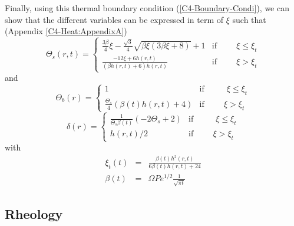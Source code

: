Finally,      using      this     thermal      boundary      condition
(\ref{C4-Boundary-Condi}), we  can show  that the  different variables
can   be   expressed   in   term  of   $\xi$   such   that   (Appendix
\ref{C4-Heat:AppendixA})
\begin{equation}
  \Theta_s(r,t)=
  \begin{cases}
    \frac{3 \beta}{4} \xi - \frac{\sqrt{3}}{4} \sqrt{\beta \xi \left(3 \beta \xi + 8\right)} + 1 & \text{if} \hspace{1cm} \xi\leq \xi_t \\
    \frac{- 12  \xi +  6 h{\left  (r,t \right  )}}{\left(\beta h{\left
            (r,t  \right  )} +  6\right)  h{\left  (r,t \right  )}}  &
    \text{if} \hspace{1cm} \xi > \xi_t
  \end{cases}
  \label{C4-TS}
\end{equation}
and
\begin{equation}
  \Theta_b(r)=
  \begin{cases}
    1 &\text{if } \hspace{1cm} \xi\leq \xi_t \\
    \frac{\Theta_{s}}{4}  \left(\beta(t)  h{\left  (r,t  \right  )}  +
      4\right) & \text{if} \hspace{1cm} \xi > \xi_t
  \end{cases}
  \label{C4-TB}
\end{equation}
\begin{equation}
  \delta(r)=
  \begin{cases}
    \frac{1}{\Theta_{s} \beta(t)} \left(- 2 \Theta_{s} + 2\right) &\text{if } \hspace{1cm} \xi\leq \xi_t \\
    h(r,t)/2 & \text{if} \hspace{1cm} \xi > \xi_t
  \end{cases}
  \label{C4-DELTA}
\end{equation}
with
\begin{eqnarray}
  \xi_t(t)&=&\frac{\beta(t) h^{2}{\left (r,t \right )}}{6 \beta(t) h{\left (r,t \right )}
              + 24}\\
  \beta(t) &=& \Omega Pe^{1/2}\frac{1}{\sqrt{\pi t}}
\end{eqnarray}

\subsection{Rheology}
\label{C4-sec:rheology}

